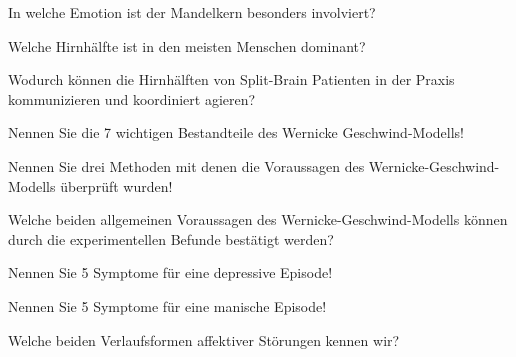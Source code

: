 \documentclass[10pt, a4paper]{exam}
\begin{document}
\begin{questions}
\begin{solution}
  \end{solution}

  \question In welche Emotion ist der Mandelkern besonders involviert?
  \begin{solution}

  \end{solution}

  \question Welche Hirnhälfte ist in den meisten Menschen dominant?
  \begin{solution}

  \end{solution}

  \question Wodurch können die Hirnhälften von Split-Brain Patienten in der Praxis kommunizieren und koordiniert agieren?
  \begin{solution}

  \end{solution}

  \question Nennen Sie die 7 wichtigen Bestandteile des Wernicke Geschwind-Modells!
  \begin{solution}

  \end{solution}

  \question Nennen Sie drei Methoden mit denen die Voraussagen des Wernicke-Geschwind-Modells überprüft wurden!
  \begin{solution}

  \end{solution}

  \question Welche beiden allgemeinen Voraussagen des Wernicke-Geschwind-Modells können durch die experimentellen Befunde bestätigt werden?
  \begin{solution}

  \end{solution}

  \question Nennen Sie 5 Symptome für eine depressive Episode!
  \begin{solution}

  \end{solution}

  \question Nennen Sie 5 Symptome für eine manische Episode!
  \begin{solution}

  \end{solution}

  \question Welche beiden Verlaufsformen affektiver Störungen kennen wir?
  \begin{solution}

  \end{solution}


\end{questions}
\end{document}
